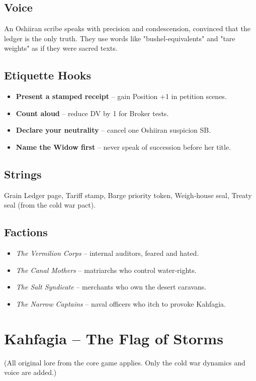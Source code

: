 \documentclass[11pt]{book}
\begin{document}
\subsection*{Voice}
An Oshiiran scribe speaks with precision and condescension, convinced that the ledger is the only truth. They use words like "bushel‑equivalents" and "tare weights" as if they were sacred texts.

\subsection*{Etiquette Hooks}
\begin{itemize}
\item \textbf{Present a stamped receipt} -- gain Position +1 in petition scenes.
\item \textbf{Count aloud} -- reduce DV by 1 for Broker tests.
\item \textbf{Declare your neutrality} -- cancel one Oshiiran suspicion SB.
\item \textbf{Name the Widow first} -- never speak of succession before her title.
\end{itemize}

\subsection*{Strings}
Grain Ledger page, Tariff stamp, Barge priority token, Weigh‑house seal, Treaty seal (from the cold war pact).

\subsection*{Factions}
\begin{itemize}
\item \emph{The Vermilion Corps} -- internal auditors, feared and hated.
\item \emph{The Canal Mothers} -- matriarchs who control water‑rights.
\item \emph{The Salt Syndicate} -- merchants who own the desert caravans.
\item \emph{The Narrow Captains} -- naval officers who itch to provoke Kahfagia.
\end{itemize}

\section{Kahfagia -- The Flag of Storms}

(All original lore from the core game applies. Only the cold war dynamics and voice are added.)
\end{document}
